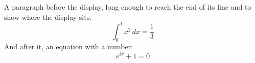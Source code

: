 \documentclass{article}
\begin{document}
A paragraph before the display, long enough to reach the end of its line
and to show where the display sits.
\[ \int_0^1 x^2 \, dx = \frac{1}{3} \]
And after it, an equation with a number:
\begin{equation} e^{i\pi} + 1 = 0 \end{equation}
\end{document}
